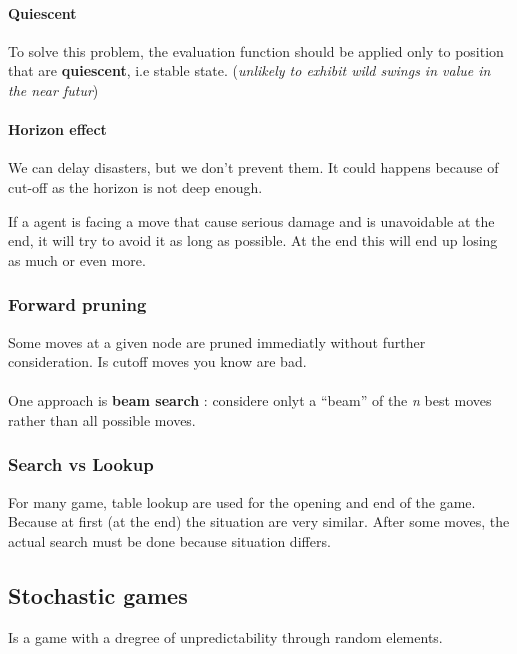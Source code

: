 \paragraph{Quiescent}  To solve  this problem,  the evaluation  function
should  be applied  only to  position that  are \textbf{quiescent},  i.e
stable state. (\textit{unlikely  to exhibit wild swings in  value in the
near futur})

\paragraph{Horizon effect} We can delay disasters, but we don't prevent them. It could happens because of cut-off as the horizon is not deep enough.

If a agent is facing a move that cause serious damage and is unavoidable at the end, it will try to avoid it as long as possible. At the end this will end up losing as much or even more.

\subsubsection{Forward pruning}
Some moves at a given node are pruned immediatly without further consideration.
Is cutoff moves you know are bad.

\paragraph{ } One approach is \textbf{beam search} : considere onlyt a ``beam'' of the 
\textit{n} best moves rather than all possible moves.


\subsubsection{Search vs Lookup}

For many  game, table lookup  are used for the  opening and end  of the 
game. Because  at first (at  the end)  the situation are  very similar. 
After  some moves,  the actual  search must  be done  because situation 
differs.                                                                



\subsection{Stochastic games}
Is a game with a dregree of unpredictability through random elements.

